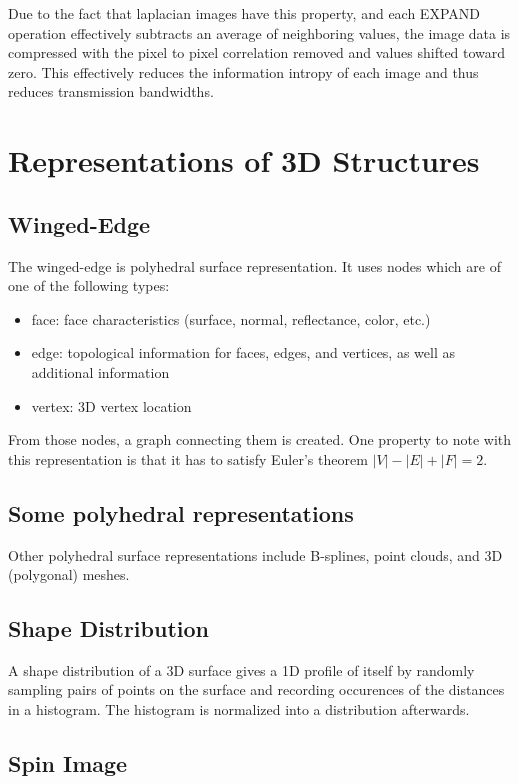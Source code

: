 \documentclass{article}
\begin{document}
\begin{multicols}{3}
Due to the fact that laplacian images have this property, and each EXPAND operation effectively subtracts an average of neighboring values, the image data is compressed with the pixel to pixel correlation removed and values shifted toward zero. This effectively reduces the information intropy of each image and thus reduces transmission bandwidths.

\section{Representations of 3D Structures}
\subsection{Winged-Edge}

The winged-edge is polyhedral surface representation. It uses nodes which are of one of the following types:

\begin{itemize}
\itemsep0em
\item face: face characteristics (surface, normal, reflectance, color, etc.)
\item edge: topological information for faces, edges, and vertices, as well as additional information
\item vertex: 3D vertex location
\end{itemize}

From those nodes, a graph connecting them is created. One property to note with this representation is that it has to satisfy Euler's theorem $|V|-|E|+|F|=2$.

\subsection{Some polyhedral representations}

Other polyhedral surface representations include B-splines, point clouds, and 3D (polygonal) meshes.

\subsection{Shape Distribution}

A shape distribution of a 3D surface gives a 1D profile of itself by randomly sampling pairs of points on the surface and recording occurences of the distances in a histogram. The histogram is normalized into a distribution afterwards.

\subsection{Spin Image}


\end{multicols}
\end{document}
